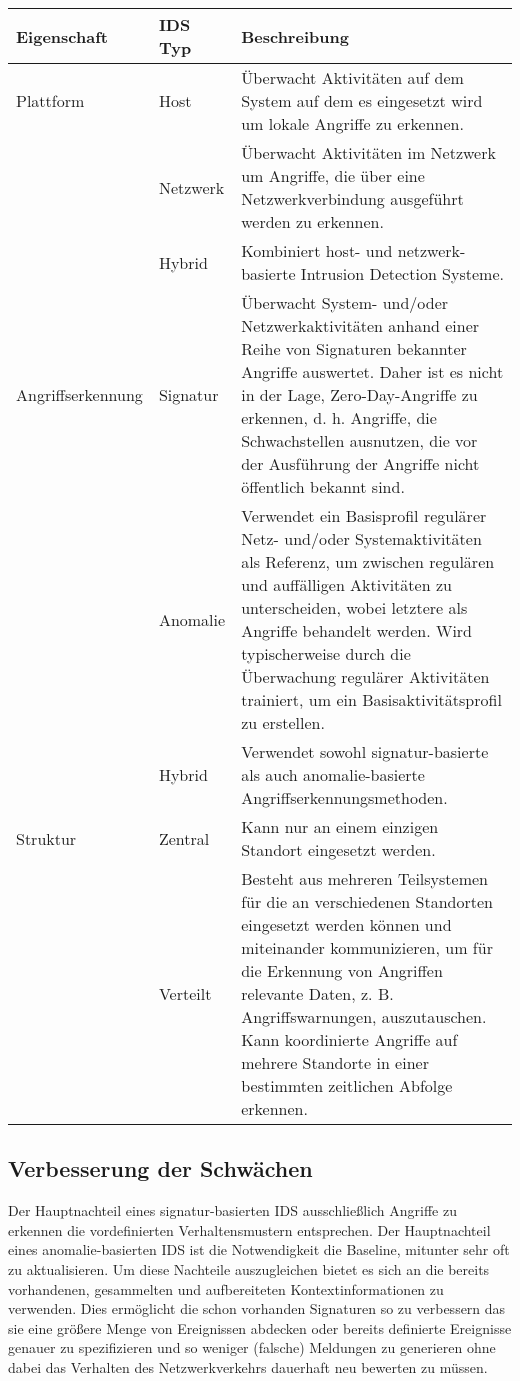 \begin{tabularx}{\columnwidth}{p{3cm} l p{10cm}}
\hline
Eigenschaft 
& IDS Typ 
& Beschreibung\\
\hline
Plattform   
& Host     
& Überwacht Aktivitäten auf dem System auf dem es eingesetzt wird um lokale Angriffe zu erkennen. \\
& Netzwerk 
& Überwacht Aktivitäten im Netzwerk um Angriffe, die über eine Netzwerkverbindung ausgeführt werden zu erkennen.\\ 
& Hybrid   
& Kombiniert host- und netzwerk-basierte Intrusion Detection Systeme.\\
\hline
Angriffserkennung 
& Signatur        
& Überwacht System- und/oder Netzwerkaktivitäten anhand einer Reihe von Signaturen bekannter Angriffe auswertet. Daher ist es nicht in der Lage, Zero-Day-Angriffe zu erkennen, d. h. Angriffe, die Schwachstellen ausnutzen, die vor der Ausführung der Angriffe nicht öffentlich bekannt sind.\\
& Anomalie        
& Verwendet ein Basisprofil regulärer Netz- und/oder Systemaktivitäten als Referenz, um zwischen regulären und auffälligen Aktivitäten zu unterscheiden, wobei letztere als Angriffe behandelt werden. Wird typischerweise durch die Überwachung regulärer Aktivitäten trainiert, um ein Basisaktivitätsprofil zu erstellen.\\
& Hybrid          
& Verwendet sowohl signatur-basierte als auch anomalie-basierte Angriffserkennungsmethoden.\\ 
\hline
Struktur
& Zentral
& Kann nur an einem einzigen Standort eingesetzt werden.\\
& Verteilt
& Besteht aus mehreren Teilsystemen für die an verschiedenen Standorten eingesetzt werden können und miteinander kommunizieren, um für die Erkennung von Angriffen relevante Daten, z. B. Angriffswarnungen, auszutauschen. Kann koordinierte Angriffe auf mehrere Standorte in einer bestimmten zeitlichen Abfolge erkennen.\\
\hline
\end{tabularx}

\subsection{Verbesserung der Schwächen}
Der Hauptnachteil eines signatur-basierten IDS ausschließlich Angriffe zu erkennen die vordefinierten Verhaltensmustern entsprechen. Der Hauptnachteil eines anomalie-basierten IDS  ist die Notwendigkeit die Baseline, mitunter sehr oft zu aktualisieren. 
Um diese Nachteile auszugleichen bietet es sich an die bereits vorhandenen, gesammelten und aufbereiteten Kontextinformationen zu verwenden. Dies ermöglicht die schon vorhanden Signaturen so zu verbessern das sie eine größere Menge von Ereignissen abdecken oder bereits definierte Ereignisse genauer zu spezifizieren und so weniger (falsche) Meldungen zu generieren ohne dabei das Verhalten des Netzwerkverkehrs dauerhaft neu bewerten zu müssen.
\pagebreak
